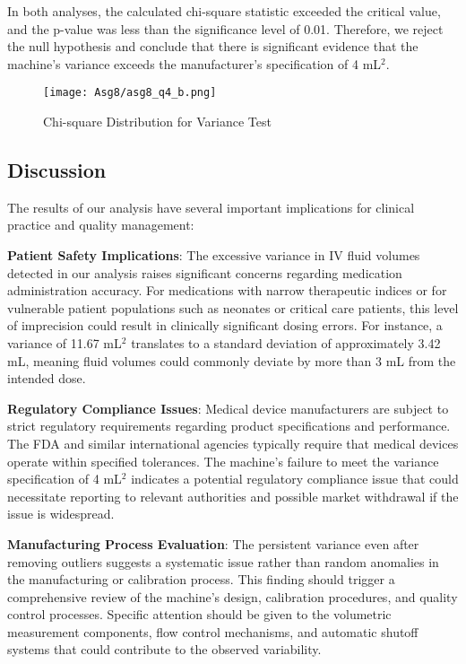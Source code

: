 \documentclass[12pt]{article}
\begin{document}
In both analyses, the calculated chi-square statistic exceeded the critical value, and the p-value was less than the significance level of 0.01. Therefore, we reject the null hypothesis and conclude that there is significant evidence that the machine's variance exceeds the manufacturer's specification of 4 mL$^2$.


\begin{figure}[H]
    \centering
    \texttt{[image: Asg8/asg8\_q4\_b.png]}
    \caption{Chi-square Distribution for Variance Test}
    \label{fig:enter-label}
\end{figure}

\subsection{Discussion}
The results of our analysis have several important implications for clinical practice and quality management:

\textbf{Patient Safety Implications}: The excessive variance in IV fluid volumes detected in our analysis raises significant concerns regarding medication administration accuracy. For medications with narrow therapeutic indices or for vulnerable patient populations such as neonates or critical care patients, this level of imprecision could result in clinically significant dosing errors. For instance, a variance of 11.67 mL$^2$ translates to a standard deviation of approximately 3.42 mL, meaning fluid volumes could commonly deviate by more than 3 mL from the intended dose.

\textbf{Regulatory Compliance Issues}: Medical device manufacturers are subject to strict regulatory requirements regarding product specifications and performance. The FDA and similar international agencies typically require that medical devices operate within specified tolerances. The machine's failure to meet the variance specification of 4 mL$^2$ indicates a potential regulatory compliance issue that could necessitate reporting to relevant authorities and possible market withdrawal if the issue is widespread.

\textbf{Manufacturing Process Evaluation}: The persistent variance even after removing outliers suggests a systematic issue rather than random anomalies in the manufacturing or calibration process. This finding should trigger a comprehensive review of the machine's design, calibration procedures, and quality control processes. Specific attention should be given to the volumetric measurement components, flow control mechanisms, and automatic shutoff systems that could contribute to the observed variability.
\end{document}
